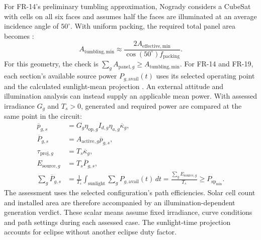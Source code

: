 For FR-14's preliminary tumbling approximation, Nogrady considers a CubeSat with cells on all six faces and assumes half the faces are illuminated at an average incidence angle of $50^\circ$. With uniform packing, the required total panel area becomes \citep[Sec.~4.3.4, Eq.~(27)]{review-1009}:
\begin{equation}
    A_{\mathrm{tumbling,min}}\approx
    \frac{2A_{\mathrm{effective,min}}}{\cos(50^\circ)f_{\mathrm{packing}}}.
    \label{eq:array-tumbling-area}
\end{equation}
For this geometry, the check is $\sum_g A_{\mathrm{panel},g}\geq A_{\mathrm{tumbling,min}}$. For FR-14 and FR-19, each section's available source power $P_{g,\mathrm{avail}}(t)$ uses its selected operating point and the calculated sunlight-mean projection \citep[Sec.~II]{review-1231}. An external attitude and illumination analysis can instead supply an applicable mean power. With assessed irradiance $G_g$ and $T_s>0$, generated and required power are compared at the same point in the circuit:
\begin{align}
    \overline p_{g,s}
    &=G_g\eta_{\mathrm{op},g}I_{d,g}\eta_{a,g}\overline\kappa_g,
    \label{eq:section-mean-power-density} \\
    \overline P_{g,s}&=A_{\mathrm{active},g}\overline p_{g,s},
    \label{eq:section-mean-source-power} \\
    \tau_{\mathrm{proj},g}&=T_s\overline\kappa_g,
    \label{eq:section-projected-sunlight-duration} \\
    E_{\mathrm{source},g}&=T_s\overline P_{g,s},
    \label{eq:section-source-energy} \\
    \sum_g\overline P_{g,s}
    &=\frac{1}{T_s}\int_{\mathrm{sunlight}}\sum_g P_{g,\mathrm{avail}}(t)\,dt
    =\frac{\sum_g E_{\mathrm{source},g}}{T_s}
    \geq P_{\mathrm{sp}_{\min}}.
    \label{eq:array-generation-screen}
\end{align}
The assessment uses the selected configuration's path efficiencies. Solar cell count and installed area are therefore accompanied by an illumination-dependent generation verdict. These scalar means assume fixed irradiance, curve conditions and path settings during each assessed case. The sunlight-time projection accounts for eclipse without another eclipse duty factor.

